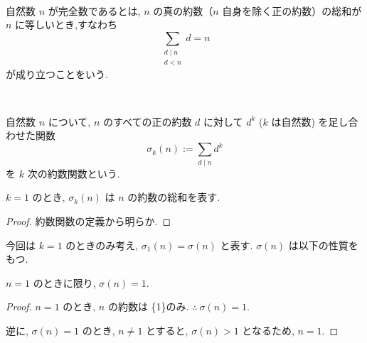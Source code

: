 %

\begin{definition}[完全数]\label{perfect}\leanok~\

自然数 \(n\) が完全数であるとは, \(n\) の真の約数（\(n\) 自身を除く正の約数）の総和が \(n\) に等しいとき,すなわち
\[ \sum_{\substack{d \mid n\\ d < n}} d = n \]
が成り立つことをいう.

\end{definition}


\begin{definition}[約数関数]\label{sigma_div}\leanok~\

自然数 \(n\) について, \(n\) のすべての正の約数 \(d\) に対して \(d^k\) (\(k\) は自然数) を足し合わせた関数
\[ \sigma_k(n) := \sum_{d \mid n} d^k \]
を \(k\) 次の約数関数という.

\end{definition}


\begin{lemma}\label{sigma_one_apply}\leanok{}
\(k = 1\) のとき, \(\sigma_k(n)\) は \(n\) の約数の総和を表す.
\end{lemma}

\begin{proof}
約数関数の定義から明らか.
\end{proof}


今回は \(k = 1\) のときのみ考え, \(\sigma_1(n) = \sigma(n)\) と表す.
\(\sigma(n)\) は以下の性質をもつ.


\begin{lemma}\label{one_iff_sum_divisors_eq_one}
\leanok{}
\(n = 1\) のときに限り, \(\sigma(n) = 1\).
\end{lemma}

\begin{proof}
\(n = 1\) のとき, \(n\) の約数は \{1\}のみ. \(\therefore ~\sigma(n) = 1\).

逆に, \(\sigma(n) = 1\) のとき, \(n \neq 1\) とすると, \(\sigma(n) > 1\) となるため, \(n = 1\).
\end{proof}


